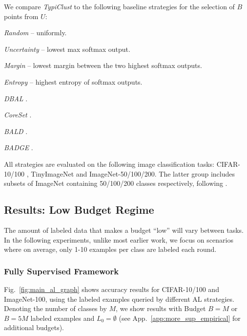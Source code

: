 \documentclass{article}
\newcommand{\app}{App.}
\begin{document}
We compare \emph{TypiClust} to the following baseline strategies for the selection of $B$ points from $U$: \begin{inparaenum}[(1)] \item \emph{Random} -- uniformly. \item \emph{Uncertainty} -- lowest max softmax output. \item \emph{Margin} -- lowest margin between the two highest softmax outputs. \item \emph{Entropy} --  highest entropy of softmax outputs. \item \emph{DBAL} \citep{gal2017deep}.
\item \emph{CoreSet} \citep{sener2018active}. \item \emph{BALD} \citep{kirsch2019batchbald}. \item \emph{BADGE} \citep{DBLP:conf/iclr/AshZK0A20}. \end{inparaenum} All strategies are evaluated on the following image classification tasks: CIFAR-10/100 \citep{krizhevsky2009learning}, TinyImageNet \citep{le2015tiny} and ImageNet-50/100/200. The latter group includes subsets of ImageNet \citep{deng2009imagenet} containing 50/100/200 classes respectively, following \citet{van2020scan}.



\subsection{Results: Low Budget Regime}
\label{sec:emp_results}
The amount of labeled data that makes a budget ``low'' will vary between tasks. In the following experiments, unlike most earlier work, we focus on scenarios where on average, only 1-10 examples per class are labeled each round.


\subsubsection{Fully Supervised Framework} 
\label{sec:fwork:(i)}

Fig.~\ref{fig:main_al_graph} shows accuracy results for CIFAR-10/100 and ImageNet-100, using the labeled examples queried by different AL strategies. Denoting the number of classes by $M$, we show results with Budget $B=M$ or $B=5M$ labeled examples and $L_0=\emptyset$ (see \app~\ref{app:more_sup_empirical} for additional budgets).
\end{document}
